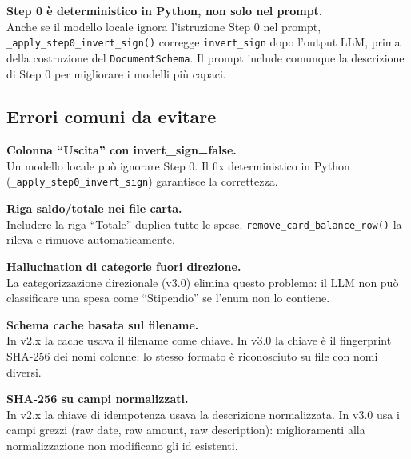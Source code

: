 \documentclass[11pt, a4paper]{article}
\begin{document}
\begin{warnbox}
\textbf{Step 0 è deterministico in Python, non solo nel prompt.}\\
Anche se il modello locale ignora l'istruzione Step 0 nel prompt,
\texttt{\_apply\_step0\_invert\_sign()} corregge \texttt{invert\_sign}
dopo l'output LLM, prima della costruzione del \texttt{DocumentSchema}.
Il prompt include comunque la descrizione di Step 0 per migliorare
i modelli più capaci.
\end{warnbox}

\subsection{Errori comuni da evitare}

\begin{warnbox}
\textbf{Colonna ``Uscita'' con invert\_sign=false.}\\
Un modello locale può ignorare Step 0. Il fix deterministico in Python
(\texttt{\_apply\_step0\_invert\_sign}) garantisce la correttezza.
\end{warnbox}

\begin{warnbox}
\textbf{Riga saldo/totale nei file carta.}\\
Includere la riga ``Totale'' duplica tutte le spese.
\texttt{remove\_card\_balance\_row()} la rileva e rimuove automaticamente.
\end{warnbox}

\begin{warnbox}
\textbf{Hallucination di categorie fuori direzione.}\\
La categorizzazione direzionale (v3.0) elimina questo problema: il LLM
non può classificare una spesa come ``Stipendio'' se l'enum non lo contiene.
\end{warnbox}

\begin{warnbox}
\textbf{Schema cache basata sul filename.}\\
In v2.x la cache usava il filename come chiave. In v3.0 la chiave è il
fingerprint SHA-256 dei nomi colonne: lo stesso formato è riconosciuto
su file con nomi diversi.
\end{warnbox}

\begin{warnbox}
\textbf{SHA-256 su campi normalizzati.}\\
In v2.x la chiave di idempotenza usava la descrizione normalizzata.
In v3.0 usa i campi grezzi (raw date, raw amount, raw description):
miglioramenti alla normalizzazione non modificano gli id esistenti.
\end{warnbox}
\end{document}
